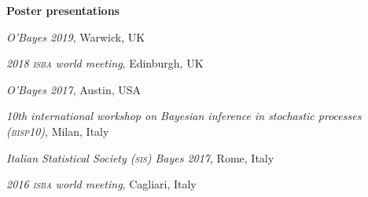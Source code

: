 \documentclass[a4paper,10pt]{article}
\newcommand{\headingfamily}{}
\newlength{\hanggap}\setlength{\hanggap}{0.75em}
\newif\ifcvfresh\cvfreshfalse
\newcommand{\subhead}[1]{%
  \ifcvfresh\cvfreshfalse\else\par\addvspace{0.4\baselineskip}\fi
  {\headingfamily\bfseries\textcolor{accent}{#1}}\nobreak\par
  \addvspace{0.15\baselineskip}\nobreak}
\newcommand{\yr}[1]{\llap{\textcolor{soft}{\footnotesize\bfseries #1}\hspace{\hanggap}}}
\begin{document}
\subhead{Poster presentations}
\begin{dated}
\item[\yr{2019}] \textsl{O'Bayes 2019}, Warwick, UK
\item[\yr{2018}] \textsl{2018 \textsc{isba} world meeting}, Edinburgh, UK
\item[\yr{2017}] \textsl{O'Bayes 2017}, Austin, USA
\item[\yr{2017}] \textsl{10th international workshop on Bayesian inference in stochastic processes (\textsc{bisp10})}, Milan, Italy
\item[\yr{2017}] \textsl{Italian Statistical Society (\textsc{sis}) Bayes 2017}, Rome, Italy
\item[\yr{2016}] \textsl{2016 \textsc{isba} world meeting}, Cagliari, Italy
\end{dated}
\end{document}
